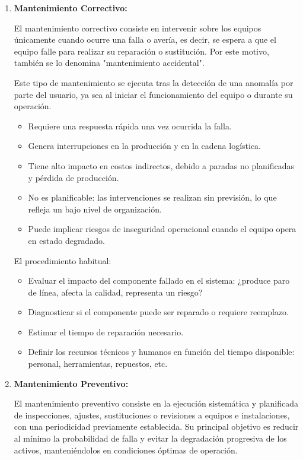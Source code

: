 \documentclass[a4paper,oneside,11pt]{article}
\begin{document}
\begin{enumerate}
    \item \textbf{Mantenimiento Correctivo:}

    El mantenimiento correctivo consiste en intervenir sobre los equipos únicamente cuando ocurre una falla o avería, es decir, se espera a que el equipo falle para realizar su reparación o sustitución. Por este motivo, también se lo denomina "mantenimiento accidental".

    Este tipo de mantenimiento se ejecuta tras la detección de una anomalía por parte del usuario, ya sea al iniciar el funcionamiento del equipo o durante su operación.

    \begin{itemize}
        \item Requiere una respuesta rápida una vez ocurrida la falla.
        \item Genera interrupciones en la producción y en la cadena logística.
        \item Tiene alto impacto en costos indirectos, debido a paradas no planificadas y pérdida de producción.
        \item No es planificable: las intervenciones se realizan sin previsión, lo que refleja un bajo nivel de organización.
        \item Puede implicar riesgos de inseguridad operacional cuando el equipo opera en estado degradado.
    \end{itemize}

    El procedimiento habitual:

    \begin{itemize}
        \item Evaluar el impacto del componente fallado en el sistema: ¿produce paro de línea, afecta la calidad, representa un riesgo?
        \item Diagnosticar si el componente puede ser reparado o requiere reemplazo.
        \item Estimar el tiempo de reparación necesario.
        \item Definir los recursos técnicos y humanos en función del tiempo disponible: personal, herramientas, repuestos, etc.
    \end{itemize}
    
    \item \textbf{Mantenimiento Preventivo:}
    
    El mantenimiento preventivo consiste en la ejecución sistemática y planificada de inspecciones, ajustes, sustituciones o revisiones a equipos e instalaciones, con una periodicidad previamente establecida. Su principal objetivo es reducir al mínimo la probabilidad de falla y evitar la degradación progresiva de los activos, manteniéndolos en condiciones óptimas de operación.
    

\end{enumerate}
\end{document}
